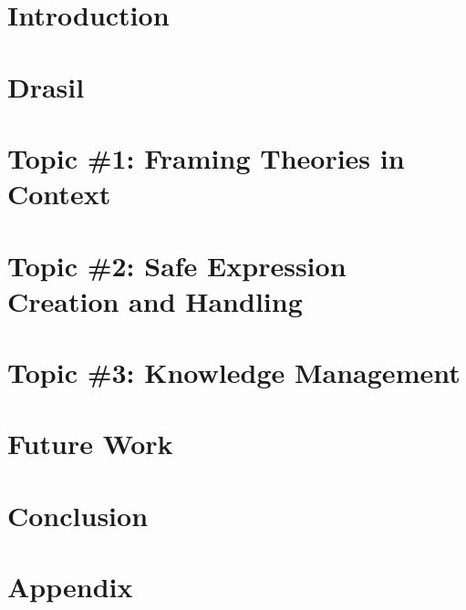 \documentclass[12pt,oneside]{book}
\begin{document}
\label{lastOfFrontMatter}


\mainmatter

\pagestyle{fancy}
\fancyhead{}
\fancyfoot{}
\fancyfoot[C]{\thepage}
\renewcommand{\headrulewidth}{0pt}

\chapter{Introduction}


\chapter{Drasil}


\chapter{Topic \#1: Framing Theories in Context}


\chapter{Topic \#2: Safe Expression Creation and Handling}


\chapter{Topic \#3: Knowledge Management}


\chapter{Future Work}


\chapter{Conclusion}


\printbibliography[heading=bibintoc]


\backmatter

\appendix
\chapter{Appendix}

\end{document}
